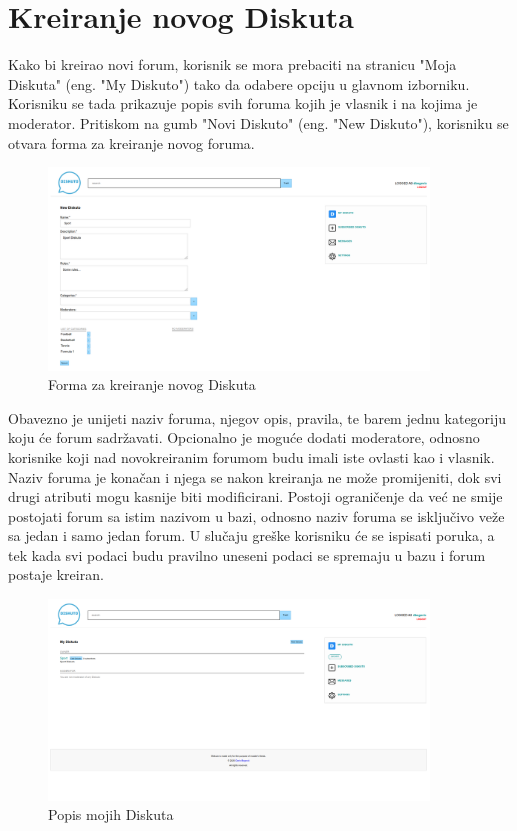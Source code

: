 \documentclass{foi}
\begin{document}
\section{Kreiranje novog Diskuta}

Kako bi kreirao novi forum, korisnik se mora prebaciti na stranicu "Moja Diskuta" (eng. "My Diskuto") tako da odabere opciju u glavnom izborniku. Korisniku se tada prikazuje popis svih foruma kojih je vlasnik i na kojima je moderator. Pritiskom na gumb "Novi Diskuto" (eng. "New Diskuto"), korisniku se otvara forma za kreiranje novog foruma.

\begin{figure}[h!]
    \centering
    \includegraphics[width=0.9\textwidth]{slike/novi-forum.png}
    \caption{Forma za kreiranje novog Diskuta}
\end{figure}

Obavezno je unijeti naziv foruma, njegov opis, pravila, te barem jednu kategoriju koju će forum sadržavati. Opcionalno je moguće dodati moderatore, odnosno korisnike koji nad novokreiranim  forumom budu imali iste ovlasti kao i vlasnik. Naziv foruma je konačan i njega se nakon kreiranja ne može promijeniti, dok svi drugi atributi mogu kasnije biti modificirani. Postoji ograničenje da već ne smije postojati forum sa istim nazivom u bazi, odnosno naziv foruma se isključivo veže sa jedan i samo jedan forum. U slučaju greške korisniku će se ispisati poruka, a tek kada svi podaci budu pravilno uneseni podaci se spremaju u bazu i forum postaje kreiran.

\begin{figure}[h!]
    \centering
    \includegraphics[width=0.9\textwidth]{slike/moji-forumi.png}
    \caption{Popis mojih Diskuta}
\end{figure}
\end{document}
